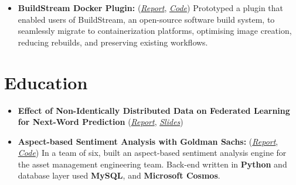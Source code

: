 \documentclass[a4paper]{deedy-resume} %
\begin{document}
\begin{itemize}
    \item \textbf{BuildStream Docker Plugin:}
          (\href{https://github.com/shashwatdalal/shashwatdalal.github.io/blob/master/files/placement_report.pdf}{\textit{Report}},
          \href{https://gitlab.com/BuildStream/bst-plugins-container}{\textit{Code}})
          \linebreak
          Prototyped a plugin that enabled users of BuildStream, an open-source software build system, to
          seamlessly migrate to containerization platforms, optimising image creation, reducing rebuilds, and preserving existing workflows.
\end{itemize}
\section{Education}
\begin{itemize}
    \item \textbf{Effect of Non-Identically Distributed Data on Federated Learning for Next-Word Prediction}
          (\href{https://shashwatdalal.github.io/files/fl_fyp.pdf}{\textit{Report}},
          \href{https://bit.ly/3bpAU8g}{\textit{Slides}})
    \item \textbf{Aspect-based Sentiment Analysis with Goldman Sachs:}
          (\href{https://github.com/shashwatdalal/shashwatdalal.github.io/blob/master/files/Software_Engineering_Project_Report.pdf}{\textit{Report}},
          \href{https://dev.azure.com/vapesoc/362\%20Software\%20Engineering\%20Project/}{\textit{Code}})
          \linebreak
          In a team of six, built an aspect-based sentiment analysis engine for the asset management engineering team. Back-end written in \textbf{Python} and database layer used \textbf{MySQL}, and \textbf{Microsoft Cosmos}.

\end{itemize}
\end{document}
